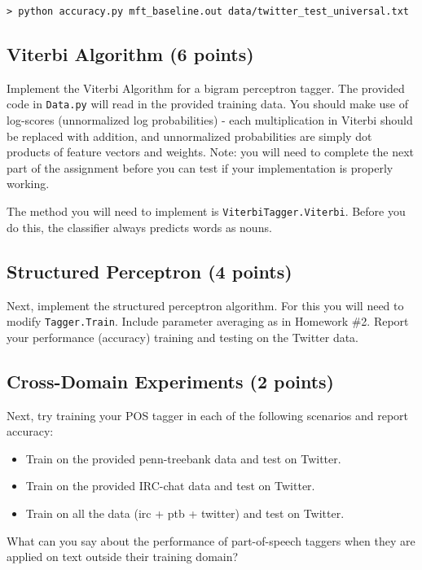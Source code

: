 \documentclass[12pt, letterpaper]{article}
\begin{document}
\begin{verbatim}
> python accuracy.py mft_baseline.out data/twitter_test_universal.txt
\end{verbatim}

\subsection*{Viterbi Algorithm (6 points)}
Implement the Viterbi Algorithm for a bigram perceptron tagger.  The provided code in {\tt Data.py} will read in the provided training data.
You should make use of log-scores (unnormalized log probabilities) - each multiplication in Viterbi should
be replaced with addition, and unnormalized probabilities are simply dot products of feature vectors and weights.
Note: you will need to complete the next part of the assignment before you can test if your implementation is properly working.

The method you will need to implement is {\tt ViterbiTagger.Viterbi}.  Before you do this, the classifier always predicts words as nouns.

\subsection*{Structured Perceptron (4 points)}
Next, implement the structured perceptron algorithm.  For this you will need to modify {\tt Tagger.Train}.  Include
parameter averaging as in Homework \#2.
Report your performance (accuracy) training and testing on the Twitter data.

\subsection*{Cross-Domain Experiments (2 points)}
Next, try training your POS tagger in each of the following scenarios and report accuracy:

\begin{itemize}
  \item Train on the provided penn-treebank data and test on Twitter.
  \item Train on the provided IRC-chat data and test on Twitter.
  \item Train on all the data (irc + ptb + twitter) and test on Twitter.
\end{itemize}

What can you say about the performance of part-of-speech taggers when they are applied on text outside their
training domain?
\end{document}
